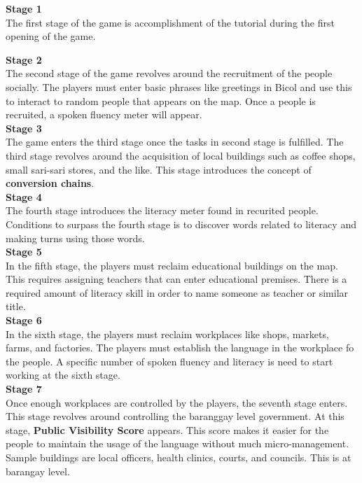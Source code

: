 \documentclass[11pt]{article}
\begin{document}
\textbf{Stage 1}\\
The first stage of the game is accomplishment of the tutorial during the first opening of the game.

\textbf{Stage 2}\\
The second stage of the game revolves around the recruitment of the people socially. The players must enter basic phrases like greetings in Bicol and use this to interact to random people that appears on the map. Once a people is recruited, a spoken fluency meter will appear.\\

\textbf{Stage 3}\\
The game enters the third stage once the tasks in second stage is fulfilled. The third stage revolves around the acquisition of local buildings such as coffee shops, small sari-sari stores, and the like. This stage introduces the concept of \textbf{conversion chains}.\\

\textbf{Stage 4}\\
The fourth stage introduces the literacy meter found in recurited people. Conditions to surpass the fourth stage is to discover words related to literacy and making turns using those words.\\

\textbf{Stage 5}\\
In the fifth stage, the players must reclaim educational buildings on the map. This requires assigning teachers that can enter educational premises. There is a required amount of literacy skill in order to name someone as teacher or similar title.\\

\textbf{Stage 6}\\
In the sixth stage, the players must reclaim workplaces like shops, markets, farms, and factories. The players must establish the language in the workplace fo the people. A specific number of spoken fluency and literacy is need to start working at the sixth stage.\\

\textbf{Stage 7}\\
Once enough workplaces are controlled by the players, the seventh stage enters. This stage revolves around controlling the baranggay level government. At this stage, \textbf{Public Visibility Score} appears. This score makes it easier for the people to maintain the usage of the language without much micro-management. Sample buildings are local officers, health clinics, courts, and councils. This is at barangay level.\\
\end{document}

